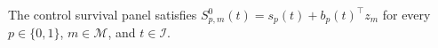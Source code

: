 The control survival panel satisfies \(S^0_{p,m}(t)=s_p(t)+b_p(t)^\top z_m\) for every \(p\in\{0,1\}\), \(m\in\mathcal M\), and \(t\in\mathcal I\).